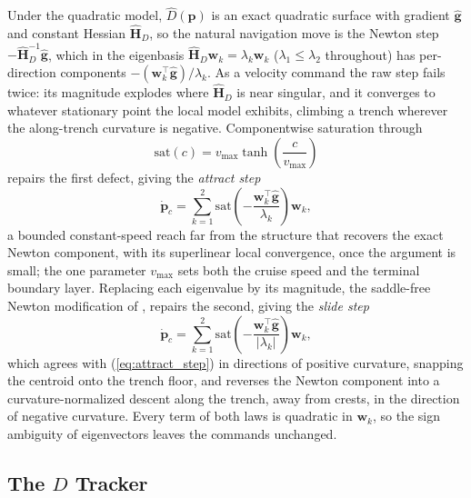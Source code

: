 \documentclass[lettersize,journal]{IEEEtran}
\begin{document}
Under the quadratic model, $\hat{D}(\mathbf{p})$ is an exact quadratic
surface with gradient $\hat{\mathbf{g}}$ and constant Hessian
$\hat{\mathbf{H}}_D$, so the natural navigation move is the Newton step
$-\hat{\mathbf{H}}_D^{-1}\hat{\mathbf{g}}$, which in the eigenbasis
$\hat{\mathbf{H}}_D \mathbf{w}_k = \lambda_k \mathbf{w}_k$ ($\lambda_1
\leq \lambda_2$ throughout) has per-direction components
$-(\mathbf{w}_k^\top \hat{\mathbf{g}})/\lambda_k$. As a velocity
command the raw step fails twice: its magnitude explodes where
$\hat{\mathbf{H}}_D$ is near singular, and it converges to whatever
stationary point the local model exhibits, climbing a trench wherever
the along-trench curvature is negative. Componentwise saturation
through
\begin{equation}
    \mathrm{sat}(c) = v_{\max} \tanh\!\left(\frac{c}{v_{\max}}\right)
    \label{eq:sat}
\end{equation}
repairs the first defect, giving the \emph{attract step}
\begin{equation}
    \dot{\mathbf{p}}_c = \sum_{k=1}^{2}
    \mathrm{sat}\!\left(-\frac{\mathbf{w}_k^\top
    \hat{\mathbf{g}}}{\lambda_k}\right)\mathbf{w}_k,
    \label{eq:attract_step}
\end{equation}
a bounded constant-speed reach far from the structure that recovers the
exact Newton component, with its superlinear local convergence, once
the argument is small; the one parameter $v_{\max}$ sets both the
cruise speed and the terminal boundary layer. Replacing each eigenvalue
by its magnitude, the saddle-free Newton modification of \cite{35},
repairs the second, giving the \emph{slide step}
\begin{equation}
    \dot{\mathbf{p}}_c = \sum_{k=1}^{2}
    \mathrm{sat}\!\left(-\frac{\mathbf{w}_k^\top
    \hat{\mathbf{g}}}{|\lambda_k|}\right)\mathbf{w}_k,
    \label{eq:slide_step}
\end{equation}
which agrees with (\ref{eq:attract_step}) in directions of positive
curvature, snapping the centroid onto the trench floor, and reverses
the Newton component into a curvature-normalized descent along the
trench, away from crests, in the direction of negative curvature. Every
term of both laws is quadratic in $\mathbf{w}_k$, so the sign ambiguity
of eigenvectors leaves the commands unchanged.

\subsection{The $D$ Tracker}
\label{sec:sep_controller}
\end{document}
